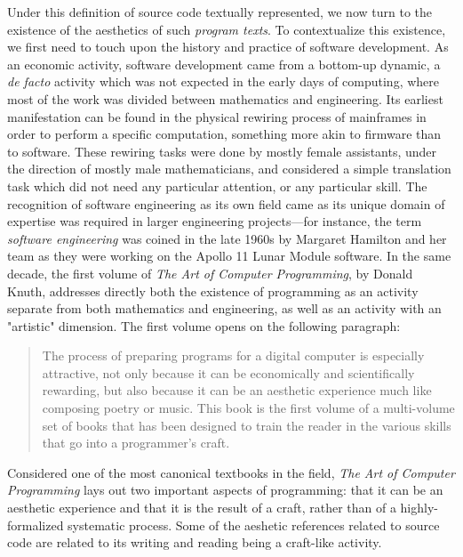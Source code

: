 Under this definition of source code textually represented, we now turn to the existence of the aesthetics of such \emph{program texts}. To contextualize this existence, we first need to touch upon the history and practice of software development. As an economic activity, software development came from a bottom-up dynamic, a \emph{de facto} activity which was not expected in the early days of computing, where most of the work was divided between mathematics and engineering. Its earliest manifestation can be found in the physical rewiring process of mainframes in order to perform a specific computation, something more akin to firmware than to software. These rewiring tasks were done by mostly female assistants, under the direction of mostly male mathematicians\cite{chun_software_2005}, and considered a simple translation task which did not need any particular attention, or any particular skill. The recognition of software engineering as its own field came as its unique domain of expertise was required in larger engineering projects—for instance, the term \emph{software engineering} was coined in the late 1960s by Margaret Hamilton and her team as they were working on the Apollo 11 Lunar Module software\cite{mindell_digital_2011}. In the same decade, the first volume of \emph{The Art of Computer Programming}, by Donald Knuth, addresses directly both the existence of programming as an activity separate from both mathematics and engineering, as well as an activity with an "artistic" dimension\cite{knuth_art_1997}. The first volume opens on the following paragraph:

\begin{quote}
    The process of preparing programs for a digital computer is especially attractive, not only because it can be economically and scientifically rewarding, but also because it can be an aesthetic experience much like composing poetry or music. This book is the first volume of a multi-volume set of books that has been designed to train the reader in the various skills that go into a programmer's craft.\cite{knuth_art_1997}
\end{quote}

Considered one of the most canonical textbooks in the field, \emph{The Art of Computer Programming} lays out two important aspects of programming: that it can be an aesthetic experience and that it is the result of a craft, rather than of a highly-formalized systematic process. Some of the aeshetic references related to source code are related to its writing and reading being a craft-like activity\cite{dijkstra_craftsman_1982}.

